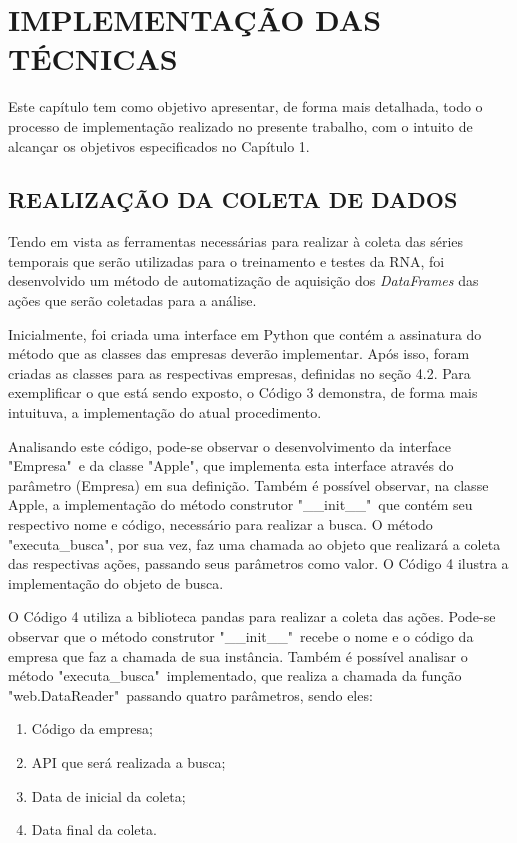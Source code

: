
\chapter{IMPLEMENTAÇÃO DAS TÉCNICAS}\label{ch:implementacao}
Este capítulo tem como objetivo apresentar, de forma mais detalhada, todo o processo de implementação realizado no presente trabalho, com o intuito de alcançar os objetivos especificados no Capítulo 1.

\section{REALIZAÇÃO DA COLETA DE DADOS}
Tendo em vista as ferramentas necessárias para realizar à coleta das séries temporais que serão utilizadas para o treinamento e testes da RNA, foi desenvolvido um método de automatização de aquisição dos \textit{DataFrames} das ações que serão coletadas para a análise.

Inicialmente, foi criada uma interface em Python que contém a assinatura do método que as classes das empresas deverão implementar. Após isso, foram criadas as classes para as respectivas empresas, definidas no seção 4.2. Para exemplificar o que está sendo exposto, o Código 3 demonstra, de forma mais intuituva, a implementação do atual procedimento.
\codigoPython\


Analisando este código, pode-se observar o desenvolvimento da interface "Empresa"\, e da classe "Apple", que implementa esta interface através do parâmetro (Empresa) em sua definição. Também é possível observar, na classe Apple, a implementação do método construtor "\_\_init\_\_"\, que contém seu respectivo nome e código, necessário para realizar a busca. O método "executa\_busca", por sua vez, faz uma chamada ao objeto que realizará a coleta das respectivas ações, passando seus parâmetros como valor. O Código 4 ilustra a implementação do objeto de busca.



O Código 4 utiliza a biblioteca pandas para realizar a coleta das ações. Pode-se observar que o método construtor "\_\_init\_\_"\, recebe o nome e o código da empresa que faz a chamada de sua instância. Também é possível analisar o método "executa\_busca"\, implementado, que realiza a chamada da função "web.DataReader"\,
passando quatro parâmetros, sendo eles:
\begin{enumerate}
\item Código da empresa;
\item API que será realizada a busca;
\item Data de inicial da coleta;
\item Data final da coleta.
\end{enumerate}

